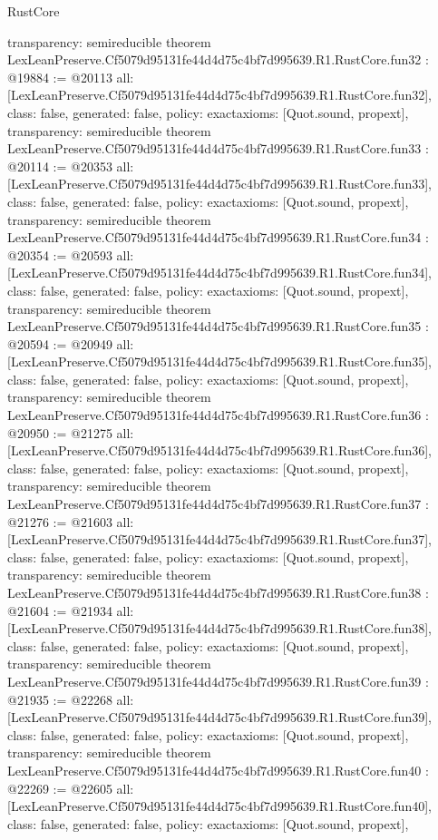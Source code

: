\begin{lexlean}{RustCore}
\begin{coremodule}
{  transparency: semireducible
}
theorem LexLeanPreserve.Cf5079d95131fe44d4d75c4bf7d995639.R1.RustCore.fun32 : @19884 := @20113 {
  all: [LexLeanPreserve.Cf5079d95131fe44d4d75c4bf7d995639.R1.RustCore.fun32],
  class: false,
  generated: false,
  policy: exact{axioms: [Quot.sound, propext]},
  transparency: semireducible
}
theorem LexLeanPreserve.Cf5079d95131fe44d4d75c4bf7d995639.R1.RustCore.fun33 : @20114 := @20353 {
  all: [LexLeanPreserve.Cf5079d95131fe44d4d75c4bf7d995639.R1.RustCore.fun33],
  class: false,
  generated: false,
  policy: exact{axioms: [Quot.sound, propext]},
  transparency: semireducible
}
theorem LexLeanPreserve.Cf5079d95131fe44d4d75c4bf7d995639.R1.RustCore.fun34 : @20354 := @20593 {
  all: [LexLeanPreserve.Cf5079d95131fe44d4d75c4bf7d995639.R1.RustCore.fun34],
  class: false,
  generated: false,
  policy: exact{axioms: [Quot.sound, propext]},
  transparency: semireducible
}
theorem LexLeanPreserve.Cf5079d95131fe44d4d75c4bf7d995639.R1.RustCore.fun35 : @20594 := @20949 {
  all: [LexLeanPreserve.Cf5079d95131fe44d4d75c4bf7d995639.R1.RustCore.fun35],
  class: false,
  generated: false,
  policy: exact{axioms: [Quot.sound, propext]},
  transparency: semireducible
}
theorem LexLeanPreserve.Cf5079d95131fe44d4d75c4bf7d995639.R1.RustCore.fun36 : @20950 := @21275 {
  all: [LexLeanPreserve.Cf5079d95131fe44d4d75c4bf7d995639.R1.RustCore.fun36],
  class: false,
  generated: false,
  policy: exact{axioms: [Quot.sound, propext]},
  transparency: semireducible
}
theorem LexLeanPreserve.Cf5079d95131fe44d4d75c4bf7d995639.R1.RustCore.fun37 : @21276 := @21603 {
  all: [LexLeanPreserve.Cf5079d95131fe44d4d75c4bf7d995639.R1.RustCore.fun37],
  class: false,
  generated: false,
  policy: exact{axioms: [Quot.sound, propext]},
  transparency: semireducible
}
theorem LexLeanPreserve.Cf5079d95131fe44d4d75c4bf7d995639.R1.RustCore.fun38 : @21604 := @21934 {
  all: [LexLeanPreserve.Cf5079d95131fe44d4d75c4bf7d995639.R1.RustCore.fun38],
  class: false,
  generated: false,
  policy: exact{axioms: [Quot.sound, propext]},
  transparency: semireducible
}
theorem LexLeanPreserve.Cf5079d95131fe44d4d75c4bf7d995639.R1.RustCore.fun39 : @21935 := @22268 {
  all: [LexLeanPreserve.Cf5079d95131fe44d4d75c4bf7d995639.R1.RustCore.fun39],
  class: false,
  generated: false,
  policy: exact{axioms: [Quot.sound, propext]},
  transparency: semireducible
}
theorem LexLeanPreserve.Cf5079d95131fe44d4d75c4bf7d995639.R1.RustCore.fun40 : @22269 := @22605 {
  all: [LexLeanPreserve.Cf5079d95131fe44d4d75c4bf7d995639.R1.RustCore.fun40],
  class: false,
  generated: false,
  policy: exact{axioms: [Quot.sound, propext]},
}
\end{coremodule}
\end{lexlean}
